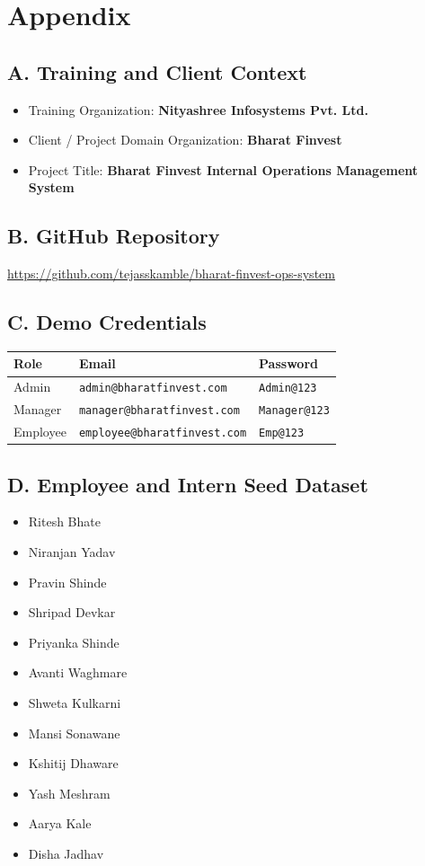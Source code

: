 \chapter{Appendix}

\section{A. Training and Client Context}
\begin{itemize}[leftmargin=1.3cm]
\item Training Organization: \textbf{Nityashree Infosystems Pvt. Ltd.}
\item Client / Project Domain Organization: \textbf{Bharat Finvest}
\item Project Title: \textbf{Bharat Finvest Internal Operations Management System}
\end{itemize}

\section{B. GitHub Repository}
\url{https://github.com/tejasskamble/bharat-finvest-ops-system}

\section{C. Demo Credentials}
\begin{table}[H]
\centering
\small
\setlength{\tabcolsep}{4pt}
\begin{tabular}{p{2.5cm}p{6.0cm}p{2.5cm}}
\toprule
\textbf{Role} & \textbf{Email} & \textbf{Password} \\
\midrule
Admin & \texttt{admin@bharatfinvest.com} & \texttt{Admin@123} \\
Manager & \texttt{manager@bharatfinvest.com} & \texttt{Manager@123} \\
Employee & \texttt{employee@bharatfinvest.com} & \texttt{Emp@123} \\
\bottomrule
\end{tabular}
\end{table}
\normalsize

\section{D. Employee and Intern Seed Dataset}
\begin{itemize}[leftmargin=1.3cm]
\item Ritesh Bhate
\item Niranjan Yadav
\item Pravin Shinde
\item Shripad Devkar
\item Priyanka Shinde
\item Avanti Waghmare
\item Shweta Kulkarni
\item Mansi Sonawane
\item Kshitij Dhaware
\item Yash Meshram
\item Aarya Kale
\item Disha Jadhav
\end{itemize}

